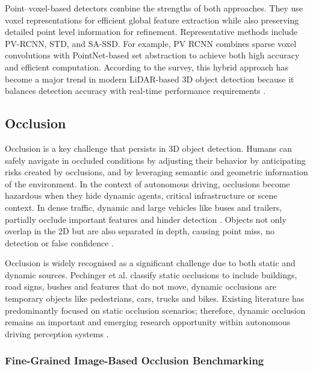 \documentclass[12pt,a4paper]{article}
\begin{document}
Point--voxel-based detectors combine the strengths of both approaches.
They use voxel representations for efficient global feature extraction
while also preserving detailed point level information for refinement.
Representative methods include PV-RCNN, STD, and SA-SSD. For example, PV
RCNN combines sparse voxel convolutions with PointNet-based set
abstraction to achieve both high accuracy and efficient computation.
According to the survey, this hybrid approach has become a major trend
in modern LiDAR-based 3D object detection because it balances detection
accuracy with real-time performance requirements
\cite{bib_ref_2,bib_ref_13}.

\subsection{Occlusion}

Occlusion is a key challenge that persists in 3D object detection.
Humans can safely navigate in occluded conditions by adjusting their
behavior by anticipating risks created by occlusions, and by
leveraging semantic and geometric information of the environment. In the
context of autonomous driving, occlusions become hazardous when they hide
dynamic agents, critical infrastructure or scene context. In dense
traffic, dynamic and large vehicles like buses and trailers,
partially occlude important features and hinder detection
\cite{bib_ref_21}. Objects not only overlap in the 2D but
are also separated in depth, causing point miss, no detection or false
confidence \cite{bib_ref_22}.

Occlusion is widely recognised as a significant challenge due to both
static and dynamic sources. Pechinger et al. \cite{bib_ref_9} classify static occlusions to include
buildings, road signs, bushes and features that do not move, dynamic
occlusions are temporary objects like pedestrians, cars, trucks and
bikes. Existing literature has predominantly focused on static occlusion
scenarios; therefore, dynamic occlusion remains an important and
emerging research opportunity within autonomous driving perception
systems \cite{bib_ref_9}.


\subsubsection{Fine-Grained Image-Based Occlusion Benchmarking}
\end{document}
